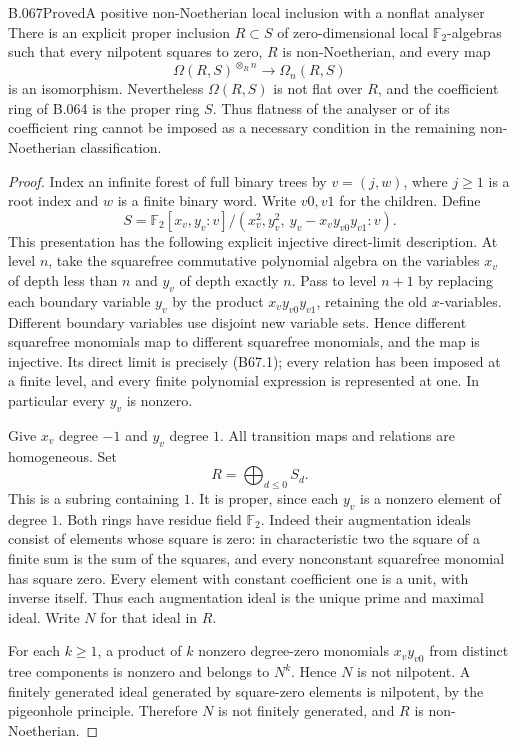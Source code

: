 \begin{saresult}{B.067}{Proved}{A positive non-Noetherian local inclusion with a nonflat analyser}
There is an explicit proper inclusion $R\subset S$
of zero-dimensional local $\mathbb F_2$-algebras
such that every nilpotent squares to zero,
$R$ is non-Noetherian, and every map
\[
 \Omega(R,S)^{\otimes_R n}\longrightarrow\Omega_n(R,S)
\]
is an isomorphism. Nevertheless $\Omega(R,S)$
is not flat over $R$, and the coefficient ring
of B.064 is the proper ring $S$.
Thus flatness of the analyser or of its coefficient
ring cannot be imposed as a necessary condition
in the remaining non-Noetherian classification.
\end{saresult}
\begin{proof}
Index an infinite forest of full binary trees by
$v=(j,w)$, where $j\ge1$ is a root index and
$w$ is a finite binary word. Write $v0,v1$ for
the children. Define
\[
 S=\mathbb F_2[x_v,y_v:v]/
       (x_v^2,y_v^2,\ y_v-x_vy_{v0}y_{v1}:v).             \tag{B67.1}
\]
This presentation has the following explicit
injective direct-limit description. At level
$n$, take the squarefree commutative polynomial
algebra on the variables $x_v$ of depth less
than $n$ and $y_v$ of depth exactly $n$.
Pass to level $n+1$ by replacing each boundary
variable $y_v$ by the product
$x_vy_{v0}y_{v1}$, retaining the old $x$-variables.
Different boundary variables use disjoint new
variable sets. Hence different squarefree
monomials map to different squarefree monomials,
and the map is injective. Its direct limit is
precisely (B67.1); every relation has been
imposed at a finite level, and every finite
polynomial expression is represented at one.
In particular every $y_v$ is nonzero.

Give $x_v$ degree $-1$ and $y_v$ degree $1$.
All transition maps and relations are homogeneous.
Set
\[
                         R=\bigoplus_{d\le0}S_d.          \tag{B67.2}
\]
This is a subring containing $1$. It is proper,
since each $y_v$ is a nonzero element of degree
$1$. Both rings have residue field $\mathbb F_2$.
Indeed their augmentation ideals consist of
elements whose square is zero: in characteristic
two the square of a finite sum is the sum of
the squares, and every nonconstant squarefree
monomial has square zero. Every element with
constant coefficient one is a unit, with
inverse itself. Thus each augmentation ideal
is the unique prime and maximal ideal.
Write $N$ for that ideal in $R$.

For each $k\ge1$, a product of $k$ nonzero
degree-zero monomials $x_vy_{v0}$ from distinct
tree components is nonzero and belongs to
$N^k$. Hence $N$ is not nilpotent. A finitely
generated ideal generated by square-zero
elements is nilpotent, by the pigeonhole
principle. Therefore $N$ is not finitely
generated, and $R$ is non-Noetherian.


\end{proof}
